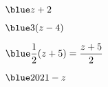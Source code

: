    \ \\ [-5mm]
   \begin{colenumerate}{2}
      \item $\blue z+2$
      \item $\blue 3(z-4)$
      \item $\blue \dfrac12(z+5) =\dfrac{z+5}{2}$ \smallskip
      \item $\blue 2021-z$
   \end{colenumerate}
